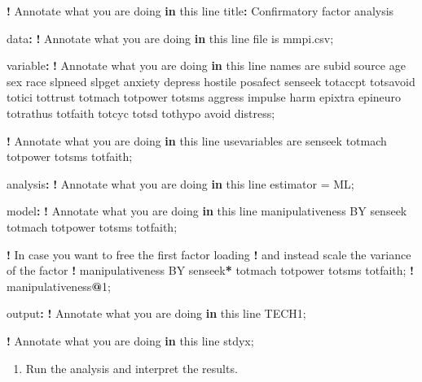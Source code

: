\documentclass[
]{book}
\newenvironment{Shaded}{\begin{snugshade}}{\end{snugshade}}
\newcommand{\ControlFlowTok}[1]{\textcolor[rgb]{0.13,0.29,0.53}{\textbf{#1}}}
\newcommand{\DecValTok}[1]{\textcolor[rgb]{0.00,0.00,0.81}{#1}}
\newcommand{\NormalTok}[1]{#1}
\newcommand{\OtherTok}[1]{\textcolor[rgb]{0.56,0.35,0.01}{#1}}
\newcommand{\SpecialCharTok}[1]{\textcolor[rgb]{0.81,0.36,0.00}{\textbf{#1}}}
\providecommand{\tightlist}{%
  \setlength{\itemsep}{0pt}\setlength{\parskip}{0pt}}
\begin{document}
\begin{Shaded}
\begin{Highlighting}[]
\SpecialCharTok{!}\NormalTok{ Annotate what you are doing }\ControlFlowTok{in}\NormalTok{ this line}
\NormalTok{title}\SpecialCharTok{:}\NormalTok{ Confirmatory factor analysis}

\NormalTok{data}\SpecialCharTok{:}
\SpecialCharTok{!}\NormalTok{ Annotate what you are doing }\ControlFlowTok{in}\NormalTok{ this line}
\NormalTok{file is mmpi.csv;}

\NormalTok{variable}\SpecialCharTok{:}
\SpecialCharTok{!}\NormalTok{ Annotate what you are doing }\ControlFlowTok{in}\NormalTok{ this line}
\NormalTok{names are subid source age sex race slpneed slpget anxiety depress}
\NormalTok{hostile posafect senseek totaccpt totsavoid totici tottrust totmach}
\NormalTok{totpower totsms aggress impulse harm epixtra epineuro totrathus}
\NormalTok{totfaith totcyc totsd tothypo avoid distress;}

\SpecialCharTok{!}\NormalTok{ Annotate what you are doing }\ControlFlowTok{in}\NormalTok{ this line}
\NormalTok{usevariables are senseek totmach totpower totsms totfaith;}

\NormalTok{analysis}\SpecialCharTok{:}
\SpecialCharTok{!}\NormalTok{ Annotate what you are doing }\ControlFlowTok{in}\NormalTok{ this line}
\NormalTok{estimator }\OtherTok{=}\NormalTok{ ML;}

\NormalTok{model}\SpecialCharTok{:}
\SpecialCharTok{!}\NormalTok{ Annotate what you are doing }\ControlFlowTok{in}\NormalTok{ this line}
\NormalTok{manipulativeness BY senseek totmach totpower totsms totfaith;}

\SpecialCharTok{!}\NormalTok{ In case you want to free the first factor loading}
\SpecialCharTok{!}\NormalTok{ and instead scale the variance of the factor}
\SpecialCharTok{!}\NormalTok{ manipulativeness BY senseek}\SpecialCharTok{*}\NormalTok{ totmach totpower totsms totfaith;}
\SpecialCharTok{!}\NormalTok{ manipulativeness}\SpecialCharTok{@}\DecValTok{1}\NormalTok{;}

\NormalTok{output}\SpecialCharTok{:}
\SpecialCharTok{!}\NormalTok{ Annotate what you are doing }\ControlFlowTok{in}\NormalTok{ this line}
\NormalTok{TECH1;}

\SpecialCharTok{!}\NormalTok{ Annotate what you are doing }\ControlFlowTok{in}\NormalTok{ this line}
\NormalTok{stdyx;}
\end{Highlighting}
\end{Shaded}

\begin{enumerate}
\def\labelenumi{\arabic{enumi}.}
\setcounter{enumi}{2}
\tightlist
\item
  Run the analysis and interpret the results.
\end{enumerate}
\end{document}
